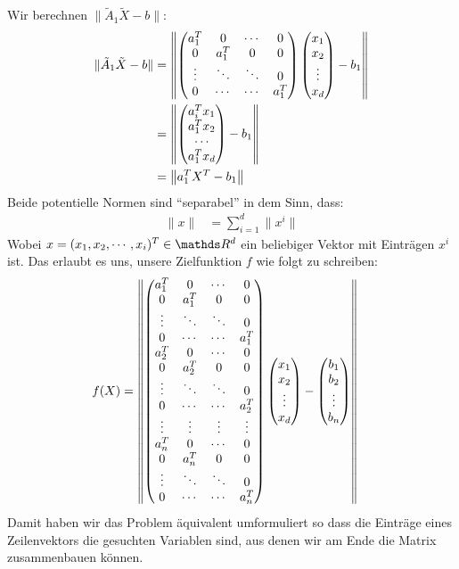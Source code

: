Wir berechnen $\|\tilde A_1 \tilde X -b\|$:
%
\begin{align*}
\|\tilde A_1 \tilde X -b\| &= 
\left\|
\begin{pmatrix}
a_1^T & 0 & \cdots & 0 \\
0 & a_1^T & 0 & 0 \\
\vdots & \ddots & \ddots & 0 \\
0 & \cdots & \cdots & a_1^T \\
\end{pmatrix}
\begin{pmatrix}
x_1 \\ x_2 \\ \vdots \\ x_d
\end{pmatrix}
-
b_1
\right\| \\
&= \left\| \begin{pmatrix} a_i^T x_1 \\ a_1^T x_2 \\ \cdots \\ a_1^T x_d \end{pmatrix} - b_1 \right\| \\
&= \left\| a_1^T X^T - b_1 \right\|
\end{align*}
%
Beide potentielle Normen sind "`separabel"' in dem Sinn, dass:
%
\begin{align*}
\|x\| &= \sum\limits_{i=1}^d \|x^i\|
\end{align*}
%
Wobei $x = (x_1, x_2, \cdots, x_i)^T \in \R^d$ ein beliebiger Vektor mit Einträgen $x^i$ ist.
Das erlaubt es uns, unsere Zielfunktion $f$ wie folgt zu schreiben:
%
\begin{align*}
f(X) &= \left\| \begin{pmatrix}
a_1^T & 0 & \cdots & 0 \\
0 & a_1^T & 0 & 0 \\
\vdots & \ddots & \ddots & 0 \\
0 & \cdots & \cdots & a_1^T \\
a_2^T & 0 & \cdots & 0 \\
0 & a_2^T & 0 & 0 \\
\vdots & \ddots & \ddots & 0 \\
0 & \cdots & \cdots & a_2^T \\
\vdots & \vdots & \vdots & \vdots \\
a_n^T & 0 & \cdots & 0 \\
0 & a_n^T & 0 & 0 \\
\vdots & \ddots & \ddots & 0 \\
0 & \cdots & \cdots & a_n^T \\
\end{pmatrix}
\begin{pmatrix}
x_1 \\ x_2 \\ \vdots \\ x_d
\end{pmatrix}
-
\begin{pmatrix}
b_1 \\ b_2 \\ \vdots \\ b_n
\end{pmatrix}
 \right\|
\end{align*}
%
Damit haben wir das Problem äquivalent umformuliert so dass die Einträge eines Zeilenvektors die gesuchten Variablen sind, aus denen wir am Ende die Matrix zusammenbauen können.


